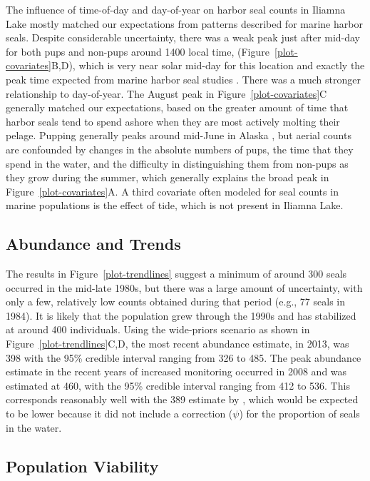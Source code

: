 \documentclass[12pt, titlepage]{article}\usepackage[]{graphicx}\usepackage[]{color}
\begin{document}
The influence of time-of-day and day-of-year on harbor seal counts in Iliamna Lake mostly matched our expectations from patterns described for marine harbor seals. Despite considerable uncertainty, there was a weak peak just after mid-day for both pups and non-pups around 1400 local time, (Figure~\ref{plot-covariates}B,D), which is very near solar mid-day for this location and exactly the peak time expected from marine harbor seal studies \citep[e.g.,][]{Simp:With:Cesa:Bove:stab:2003}. There was a much stronger relationship to day-of-year. The August peak in Figure~\ref{plot-covariates}C generally matched our expectations, based on the greater amount of time that harbor seals tend to spend ashore when they are most actively molting their pelage.  Pupping generally peaks around mid-June in Alaska \citep{Math:Pend:decl:2006}, but aerial counts are confounded by changes in the absolute numbers of pups, the time that they spend in the water, and the difficulty in distinguishing them from non-pups as they grow during the summer, which generally explains the broad peak in Figure~\ref{plot-covariates}A. A third covariate often modeled for seal counts in marine populations is the effect of tide, which is not present in Iliamna Lake.

\subsection{Abundance and Trends}

The results in Figure~\ref{plot-trendlines} suggest a minimum of around 300 seals occurred in the mid-late 1980s, but there was a large amount of uncertainty, with only a few, relatively low counts obtained during that period (e.g., 77 seals in 1984).  It is likely that the population grew through the 1990s and has stabilized at around 400 individuals.  Using the wide-priors scenario as shown in Figure~\ref{plot-trendlines}C,D, the most recent abundance estimate, in 2013, was 398 with the 95\% credible interval ranging from 326 to 485. The peak abundance estimate in the recent years of increased monitoring occurred in 2008 and was estimated at 460, with the 95\% credible interval ranging from 412 to 536. This corresponds reasonably well with the 389 estimate by \citet{ABR:wild:2011}, which would be expected to be lower because it did not include a correction ($\psi$) for the proportion of seals in the water.

\subsection{Population Viability}
\end{document}
